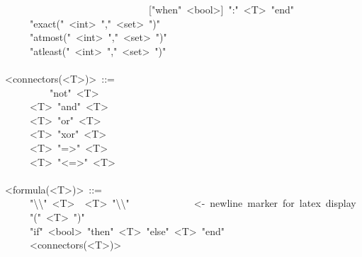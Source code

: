 \begin{footnotesize}
\begin{mdpre}
~~~~~~~~~~~~~~~~~~~~~~~~~~~~~{}["when"~{\textless{}bool\textgreater{}}]~":"~{\textless{}T\textgreater{}}~"end"\\
~~~~\textbar{}~"exact("~{\textless{}int\textgreater{}}~","~{\textless{}set\textgreater{}}~")"\\
~~~~\textbar{}~"atmost("~{\textless{}int\textgreater{}}~","~{\textless{}set\textgreater{}}~")"\\
~~~~\textbar{}~"atleast("~{\textless{}int\textgreater{}}~","~{\textless{}set\textgreater{}}~")"\\
\\
{\textless{}connectors(\textless{}T\textgreater{})\textgreater{}}~::=\\
~~~~\textbar{}~~~~~"not"~{\textless{}T\textgreater{}}\\
~~~~\textbar{}~{\textless{}T\textgreater{}}~"and"~{\textless{}T\textgreater{}}\\
~~~~\textbar{}~{\textless{}T\textgreater{}}~"or"~{\textless{}T\textgreater{}}\\
~~~~\textbar{}~{\textless{}T\textgreater{}}~"xor"~{\textless{}T\textgreater{}}\\
~~~~\textbar{}~{\textless{}T\textgreater{}}~"=\textgreater{}"~{\textless{}T\textgreater{}}\\
~~~~\textbar{}~{\textless{}T\textgreater{}}~"\textless{}=\textgreater{}"~{\textless{}T\textgreater{}}\\
\\
{\textless{}formula(\textless{}T\textgreater{})\textgreater{}}~::=\\
~~~~\textbar{}~"\textbackslash{}\textbackslash{}"~{\textless{}T\textgreater{}}~\textbar{}~{\textless{}T\textgreater{}}~"\textbackslash{}\textbackslash{}"~~~~~~~~~~~~~{\textless{}-~newline~marker~for~latex~display}\\
~~~~\textbar{}~"("~{\textless{}T\textgreater{}}~")"\\
~~~~\textbar{}~"if"~{\textless{}bool\textgreater{}}~"then"~{\textless{}T\textgreater{}}~"else"~{\textless{}T\textgreater{}}~"end"\\
~~~~\textbar{}~{\textless{}connectors(\textless{}T\textgreater{})\textgreater{}}\\

\end{mdpre}
\end{footnotesize}
